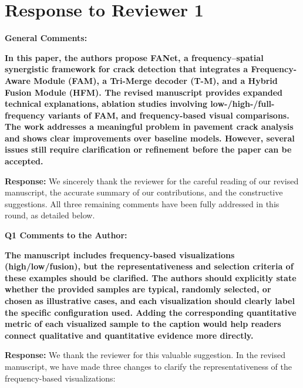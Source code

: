 \documentclass[lettersize,journal,onecolumn,12pt]{IEEEtran}
\begin{document}
\section{Response to Reviewer 1}

{\color{BlueGreen} \textbf{General Comments:}

\textbf{In this paper, the authors propose FANet, a frequency–spatial synergistic framework for crack detection that
integrates a Frequency-Aware Module (FAM), a Tri-Merge decoder (T-M), and a Hybrid Fusion Module (HFM). The revised
manuscript provides expanded technical explanations, ablation studies involving low-/high-/full-frequency variants of
FAM, and frequency-based visual comparisons. The work addresses a meaningful problem in pavement crack analysis and
shows clear improvements over baseline models. However, several issues still require clarification or refinement
before the paper can be accepted.}}

\textbf{Response:}
We sincerely thank the reviewer for the careful reading of our revised manuscript, the accurate summary of our
contributions, and the constructive suggestions. All three remaining comments have been fully addressed in this
round, as detailed below.\\[10pt]

{\color{BlueGreen} \textbf{Q1 Comments to the Author:}

\textbf{The manuscript includes frequency-based visualizations (high/low/fusion), but the representativeness and
selection criteria of these examples should be clarified. The authors should explicitly state whether the provided
samples are typical, randomly selected, or chosen as illustrative cases, and each visualization should clearly label
the specific configuration used. Adding the corresponding quantitative metric of each visualized sample to the
caption would help readers connect qualitative and quantitative evidence more directly.}}

\textbf{Response:}
We thank the reviewer for this valuable suggestion. In the revised manuscript, we have made three changes to clarify
the representativeness of the frequency-based visualizations:
\end{document}
